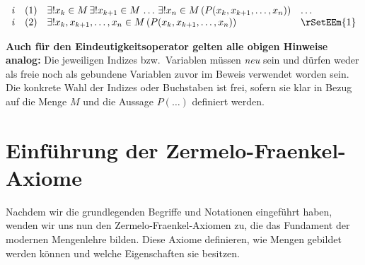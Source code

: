 \documentclass{book}
\theoremstyle{plain}
\theoremstyle{remark}
\theoremstyle{definition}
\begin{document}
\[
\begin{array}{llll}
    i & (1) & \exists! x_k \in M \, \exists! x_{k+1} \in M \, \ldots \, \exists! x_n \in M \, (P(x_k, x_{k+1}, \ldots, x_n)) & \dots \\
    i & (2) & \exists! x_k, x_{k+1}, \ldots, x_n \in M\, (P(x_k, x_{k+1}, \ldots, x_n)) & \rSetEEm{1} \\
\end{array}
\]

\noindent
\textbf{Auch für den Eindeutigkeitsoperator gelten alle obigen Hinweise analog:} 
Die jeweiligen Indizes bzw.\ Variablen müssen \emph{neu} sein und dürfen weder als freie noch als gebundene Variablen 
zuvor im Beweis verwendet worden sein. Die konkrete Wahl der Indizes oder Buchstaben ist frei, 
sofern sie klar in Bezug auf die Menge \(M\) und die Aussage \(P(\dots)\) definiert werden. 

\section{Einführung der Zermelo-Fraenkel-Axiome}

Nachdem wir die grundlegenden Begriffe und Notationen eingeführt haben, wenden wir uns nun den Zermelo-Fraenkel-Axiomen zu, die das Fundament der modernen Mengenlehre bilden. Diese Axiome definieren, wie Mengen gebildet werden können und welche Eigenschaften sie besitzen.
\end{document}
